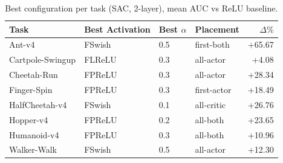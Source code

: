 \begin{table}[t]
\centering
\caption{Best configuration per task (SAC, 2-layer), mean AUC vs ReLU baseline.}
\label{tab:winner-sac-2-meanauc-relur}
\begin{tabular}{llllr}
\toprule
Task & Best Activation & Best $\alpha$ & Placement & $\Delta\%$ \\
\midrule
Ant-v4 & FSwish & 0.5 & first-both & +65.67 \\
Cartpole-Swingup & FLReLU & 0.3 & all-actor & +4.08 \\
Cheetah-Run & FPReLU & 0.3 & all-actor & +28.34 \\
Finger-Spin & FPReLU & 0.3 & first-actor & +18.49 \\
HalfCheetah-v4 & FSwish & 0.1 & all-critic & +26.76 \\
Hopper-v4 & FPReLU & 0.2 & all-both & +23.65 \\
Humanoid-v4 & FPReLU & 0.3 & all-both & +10.96 \\
Walker-Walk & FSwish & 0.5 & all-actor & +12.30 \\
\bottomrule
\end{tabular}
\end{table}
